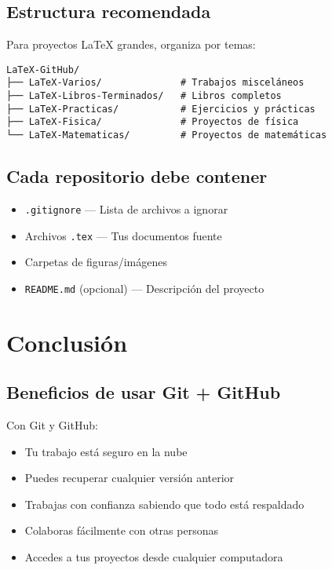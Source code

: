 \documentclass[12pt,a4paper]{article}
\begin{document}
\subsection{Estructura recomendada}

Para proyectos LaTeX grandes, organiza por temas:

\begin{lstlisting}[style=bashstyle]
LaTeX-GitHub/
├── LaTeX-Varios/              # Trabajos misceláneos
├── LaTeX-Libros-Terminados/   # Libros completos
├── LaTeX-Practicas/           # Ejercicios y prácticas
├── LaTeX-Fisica/              # Proyectos de física
└── LaTeX-Matematicas/         # Proyectos de matemáticas
\end{lstlisting}

\subsection{Cada repositorio debe contener}

\begin{itemize}
  \item \texttt{.gitignore} --- Lista de archivos a ignorar
  \item Archivos \texttt{.tex} --- Tus documentos fuente
  \item Carpetas de figuras/imágenes
  \item \texttt{README.md} (opcional) --- Descripción del proyecto
\end{itemize}

\section{Conclusión}

\subsection{Beneficios de usar Git + GitHub}

\begin{successbox}
Con Git y GitHub:
\begin{itemize}
  \item Tu trabajo está seguro en la nube
  \item Puedes recuperar cualquier versión anterior
  \item Trabajas con confianza sabiendo que todo está respaldado
  \item Colaboras fácilmente con otras personas
  \item Accedes a tus proyectos desde cualquier computadora
\end{itemize}
\end{successbox}
\end{document}
